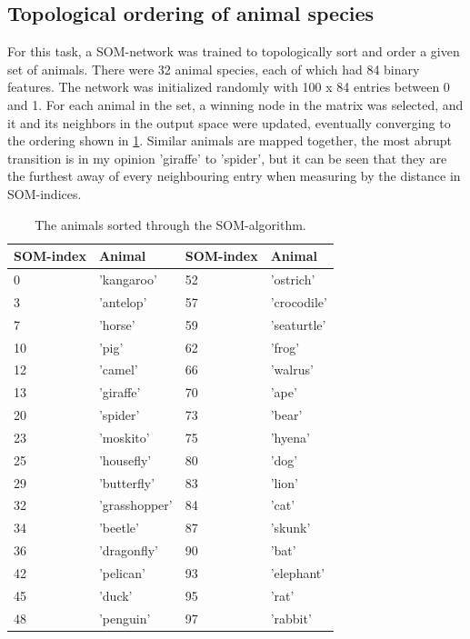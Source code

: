 \documentclass[a4paper]{article}
\begin{document}
\subsection{Topological ordering of animal species}
For this task, a SOM-network was trained to topologically sort and order a given set of animals. There were 32 animal species, each of which had 84 binary features. The network was initialized randomly with 100 x 84 entries between 0 and 1. For each animal in the set, a winning node in the matrix was selected, and it and its neighbors in the output space were updated, eventually converging to the ordering shown in \ref{tab:animals}. Similar animals are mapped together, the most abrupt transition is in my opinion 'giraffe' to 'spider', but it can be seen that they are the furthest away of every neighbouring entry when measuring by the distance in SOM-indices.

\begin{table}
\centering
\begin{tabular}{@{}llll@{}}
  \toprule
    SOM-index & Animal & SOM-index & Animal \\
  \midrule
  0   &     'kangaroo' & 52     &   'ostrich'\\
  3   &      'antelop' & 57     & 'crocodile'\\
  7   &        'horse' & 59     & 'seaturtle'\\
  10  &          'pig' & 62     &      'frog'\\
  12  &        'camel' & 66     &    'walrus'\\
  13  &      'giraffe' & 70     &       'ape'\\
  20  &       'spider' & 73     &      'bear'\\
  23  &      'moskito' & 75     &     'hyena'\\
  25  &     'housefly' & 80     &       'dog'\\
  29  &    'butterfly' & 83     &      'lion'\\
  32  &  'grasshopper' & 84     &       'cat'\\
  34  &       'beetle' & 87     &     'skunk'\\
  36  &    'dragonfly' & 90     &       'bat'\\
  42  &      'pelican' & 93     &  'elephant'\\
  45  &         'duck' & 95     &       'rat'\\
  48  &      'penguin' & 97     &    'rabbit'\\
\bottomrule
\end{tabular}
\caption{The animals sorted through the SOM-algorithm.}
\label{tab:animals}
\end{table}
\end{document}
